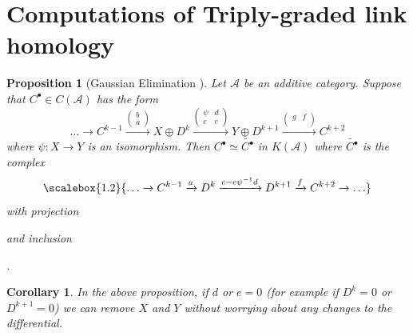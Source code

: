 \documentclass[10pt]{article}
\numberwithin{theorem}{section}
\newtheorem{prop}[theorem]{Proposition}
\newtheorem{corollary}[theorem]{Corollary}
\theoremstyle{definition}
\newcommand{\Ac}{\mathcal{A}}
\newcommand\scalemath[2]{\scalebox{#1}{\mbox{\ensuremath{\displaystyle #2}}}}
\newcommand{\0}{\ \raisebox{-2ex}{\begin{tikzpicture}[xscale=0.25,yscale=0.3,thick,baseline]
 \draw (0,0) -- (0,3); 
\end{tikzpicture}}}
\renewcommand{\1}{\ \raisebox{-2ex}{\begin{tikzpicture}[xscale=0.25,yscale=0.3,thick,baseline]
 \draw (0,0) -- (0,1);
 \draw (0,2) -- (0,3);
 \node[dot] at (0,1) {};
  \node[dot] at (0,2) {};
\end{tikzpicture}}}
\begin{document}
\section{Computations of Triply-graded link homology}\label{whiteheadsect}
\begin{prop}[Gaussian Elimination {\cite[Proposition 5.16]{Eli18}}]
\label{gausselim}
Let $\Ac$ be an additive category. Suppose that $C^\bullet\in C(\Ac)$ has the form 
\begin{equation}
\label{gausseq}
    \ldots\to C^{k-1} \xrightarrow{\begin{pmatrix}
b\\
a
\end{pmatrix}} X\oplus D^k  \xrightarrow{\begin{pmatrix}
\psi & d \\
e & c
\end{pmatrix}} Y\oplus  D^{k+1} \xrightarrow{\begin{pmatrix}
g & f\\
\end{pmatrix}} C^{k+2} 
\end{equation} 
where $\psi: X\to Y$ is an isomorphism. Then $C^\bullet\simeq \widetilde{C^\bullet}$ in $K(\Ac)$ where $\widetilde{C^\bullet}$ is the complex
\[  \scalemath{1.2}{\ldots \to C^{k-1}\xrightarrow{a} D^k \xrightarrow{c-e\psi^{-1}d}D^{k+1} \xrightarrow{f} C^{k+2} \to \ldots } \]
with projection 
and inclusion 
.
\end{prop}

\begin{corollary}
In the above proposition, if $d$ or $e=0$ (for example if $D^k=0$ or $D^{k+1}=0$) we can remove $X$ and $Y$ without worrying about any changes to the differential.
\end{corollary}
\end{document}
